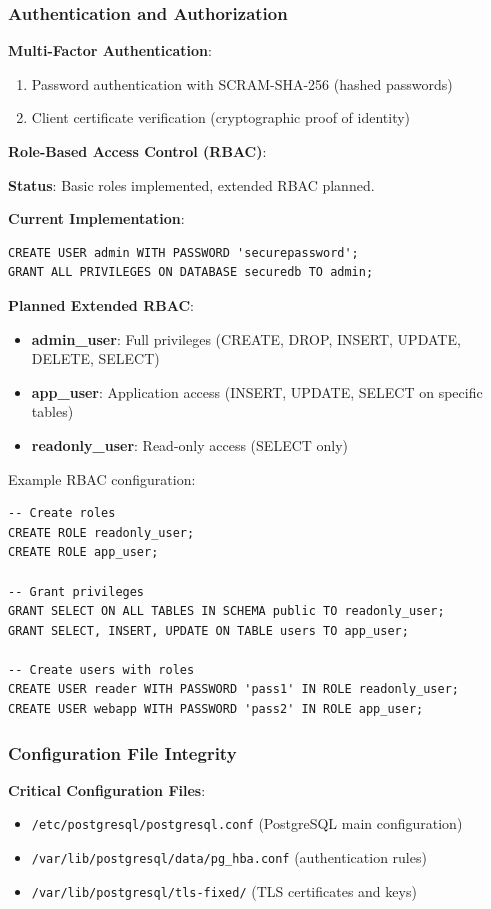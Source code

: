 \subsubsection{Authentication and Authorization}

\textbf{Multi-Factor Authentication}:
\begin{enumerate}
    \item Password authentication with SCRAM-SHA-256 (hashed passwords)
    \item Client certificate verification (cryptographic proof of identity)
\end{enumerate}

\textbf{Role-Based Access Control (RBAC)}:

\textbf{Status}: Basic roles implemented, extended RBAC planned.

\textbf{Current Implementation}:
\begin{verbatim}
CREATE USER admin WITH PASSWORD 'securepassword';
GRANT ALL PRIVILEGES ON DATABASE securedb TO admin;
\end{verbatim}

\textbf{Planned Extended RBAC}:
\begin{itemize}
    \item \textbf{admin\_user}: Full privileges (CREATE, DROP, INSERT, UPDATE, DELETE, SELECT)
    \item \textbf{app\_user}: Application access (INSERT, UPDATE, SELECT on specific tables)
    \item \textbf{readonly\_user}: Read-only access (SELECT only)
\end{itemize}

Example RBAC configuration:
\begin{verbatim}
-- Create roles
CREATE ROLE readonly_user;
CREATE ROLE app_user;

-- Grant privileges
GRANT SELECT ON ALL TABLES IN SCHEMA public TO readonly_user;
GRANT SELECT, INSERT, UPDATE ON TABLE users TO app_user;

-- Create users with roles
CREATE USER reader WITH PASSWORD 'pass1' IN ROLE readonly_user;
CREATE USER webapp WITH PASSWORD 'pass2' IN ROLE app_user;
\end{verbatim}

\subsubsection{Configuration File Integrity}

\textbf{Critical Configuration Files}:
\begin{itemize}
    \item \texttt{/etc/postgresql/postgresql.conf} (PostgreSQL main configuration)
    \item \texttt{/var/lib/postgresql/data/pg\_hba.conf} (authentication rules)
    \item \texttt{/var/lib/postgresql/tls-fixed/} (TLS certificates and keys)
\end{itemize}

